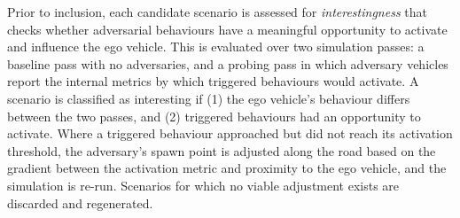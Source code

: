 Prior to inclusion, each candidate scenario is assessed for \textit{interestingness} that checks whether adversarial behaviours have a meaningful opportunity to activate and influence the ego vehicle. This is evaluated over two simulation passes: a baseline pass with no adversaries, and a probing pass in which adversary vehicles report the internal metrics by which triggered behaviours would activate. A scenario is classified as interesting if (1) the ego vehicle's behaviour differs between the two passes, and (2) triggered behaviours had an opportunity to activate. Where a triggered behaviour approached but did not reach its activation threshold, the adversary's spawn point is adjusted along the road based on the gradient between the activation metric and proximity to the ego vehicle, and the simulation is re-run. Scenarios for which no viable adjustment exists are discarded and regenerated.

